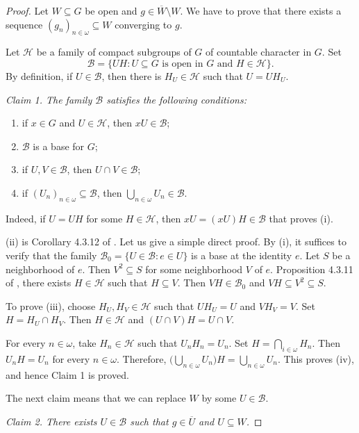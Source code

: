 \documentclass[preprint,11pt]{elsarticle}
\numberwithin{equation}{section}
\numberwithin{theorem}{section}
\newcommand{\w}{\omega}
\begin{document}
\begin{proof}
Let $W\subseteq G$ be open and $g\in \overline{W}\setminus W$. We have to prove that there exists a sequence $(g_n)_{n\in\w}\subseteq W$ converging to $g$.

Let $\mathcal{H}$ be a family of compact subgroups of $G$ of countable character in $G$. Set
\[
\mathcal{B} =\{ UH: U\subseteq G \mbox{ is open in } G \mbox{ and } H\in\mathcal{H}\}.
\]
By definition, if $U\in \mathcal{B}$, then there is $H_U\in\mathcal{H}$ such that $U=UH_U$.

{\em Claim 1. The family $\mathcal{B}$ satisfies the following conditions:
\begin{enumerate}
\item[{\rm (i)}] if $x\in G$ and $U\in\mathcal{H}$, then $xU\in\mathcal{B}$;
\item[{\rm (ii)}] $\mathcal{B}$ is a base for $G$;
\item[{\rm (iii)}] if $U,V\in \mathcal{B}$, then $U\cap V\in \mathcal{B}$;
\item[{\rm (iv)}] if $(U_n)_{n\in\w}\subseteq\mathcal{B}$, then $\bigcup_{n\in\w}U_n\in \mathcal{B}$.
\end{enumerate}
}

Indeed, if $U=UH$ for some $H\in \mathcal{H}$, then $xU=(xU)H\in\mathcal{B}$ that proves (i).

(ii) is Corollary 4.3.12 of \cite{ArT}. Let us give a simple direct proof.  By (i), it suffices to verify that the family $\mathcal{B}_0=\{U\in\mathcal{B}:e\in U\}$ is a base at the identity $e$. Let $S$ be a neighborhood of $e$. Then $V^2\subseteq S$ for some neighborhood $V$ of $e$. Proposition 4.3.11 of \cite{ArT}, there exists $H\in \mathcal{H}$ such that $H\subseteq V$. Then $VH\in\mathcal{B}_0$ and $VH\subseteq V^2\subseteq S$.

To prove (iii), choose  $H_U,H_V\in\mathcal{H}$ such that $UH_U=U$ and $VH_V=V$. Set $H=H_U\cap H_V$. Then $H\in\mathcal{H}$ and $(U\cap V)H=U\cap V$.

For every $n\in\w$, take $H_n\in\mathcal{H}$ such that $U_nH_n=U_n$. Set $H=\bigcap_{i\in\w}H_n$. Then $U_nH=U_n$ for every $n\in\w$. Therefore, $\big(\bigcup_{n\in\w}U_n\big)H=\bigcup_{n\in\w}U_n$. This proves (iv), and hence Claim 1 is proved.
\smallskip

The next claim means that we can replace $W$ by some $U\in\mathcal{B}$.
\smallskip

{\em Claim 2. There exists $U\in\mathcal{B}$ such that $g\in \overline{U}$ and $U\subseteq W$.}


\end{proof}
\end{document}

